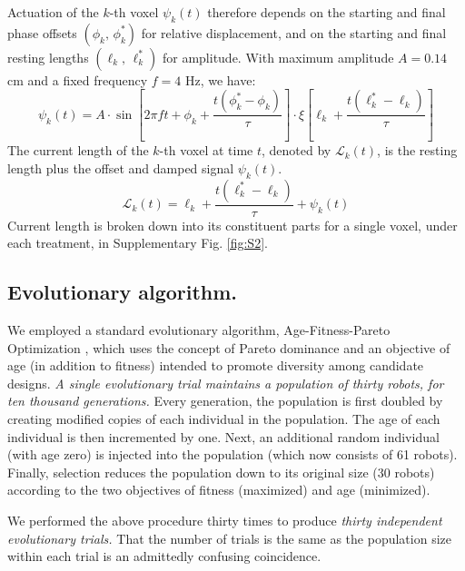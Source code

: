 Actuation of the $k$-th voxel $\psi_k(t)$ therefore depends on the starting and final phase offsets $(\phi_k,\, \phi_k^*)$ for relative displacement, and on the starting and final resting lengths $(\ell_k,\, \ell_k^*)$ for amplitude. With maximum amplitude $A=0.14$ cm and a fixed frequency $f=4$ Hz, we have:
\begin{equation}
\label{eq-actuation}
\psi_k(t) = A \cdot \sin\left[2\pi f t + \phi_k + \frac{t(\phi_k^*-\phi_k)}{\tau}\right] \cdot \xi\left[\ell_k + \frac{t(\ell_k^*-\ell_k)}{\tau}\right]
\end{equation}
The current length of the $k$-th voxel at time $t$, denoted by $\mathcal{L}_k(t)$, is the resting length plus the offset and damped signal $\psi_k(t)$.
\begin{equation}
\label{eq-curr-length}
\mathcal{L}_k(t) = \ell_k + \frac{t(\ell_k^*-\ell_k)}{\tau} + \psi_k(t)
\end{equation}
Current length is broken down into its constituent parts for a single 
voxel, under each treatment, in Supplementary Fig. \ref{fig:S2}.%



\subsection*{Evolutionary algorithm.}

We employed a standard evolutionary algorithm, Age-Fitness-Pareto Optimization \cite{Schmidt2011}, which uses the concept of Pareto dominance and an objective of age (in addition to fitness) intended to promote diversity among candidate designs. 
\textit{A single evolutionary trial maintains a population of thirty robots, for ten thousand generations.}
Every generation, the population is first doubled by creating modified copies of each individual in the population.
The age of each individual is then incremented by one.
Next, an additional random individual (with age zero) is injected into the population (which now consists of 61 robots). 
Finally, selection reduces the population down to its original size (30 robots) according to the two objectives of fitness (maximized) and age (minimized).

We performed the above procedure thirty times to produce \textit{thirty independent evolutionary trials.}
That the number of trials is the same as the population size within each trial is an admittedly confusing coincidence.

